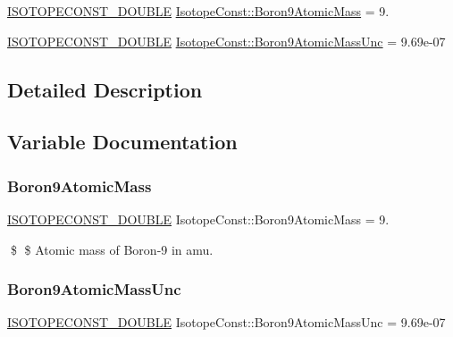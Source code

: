 \begin{DoxyCompactItemize}
\item 
\mbox{\hyperlink{group___isotope_const-_macros_ga8f45a7272ce02c0b4c65c44636ed719a}{I\+S\+O\+T\+O\+P\+E\+C\+O\+N\+S\+T\+\_\+\+D\+O\+U\+B\+LE}} \mbox{\hyperlink{group___isotope_const-_boron-_b9_ga5337f15dc8c7c59835e59dbca67ce544}{Isotope\+Const\+::\+Boron9\+Atomic\+Mass}} = 9.
\item 
\mbox{\hyperlink{group___isotope_const-_macros_ga8f45a7272ce02c0b4c65c44636ed719a}{I\+S\+O\+T\+O\+P\+E\+C\+O\+N\+S\+T\+\_\+\+D\+O\+U\+B\+LE}} \mbox{\hyperlink{group___isotope_const-_boron-_b9_ga8cd37457b5906b9b0eeb60c987074c89}{Isotope\+Const\+::\+Boron9\+Atomic\+Mass\+Unc}} = 9.\+69e-\/07
\end{DoxyCompactItemize}


\subsection{Detailed Description}


\subsection{Variable Documentation}
\mbox{\label{group___isotope_const-_boron-_b9_ga5337f15dc8c7c59835e59dbca67ce544}} 
\subsubsection{\texorpdfstring{Boron9\+Atomic\+Mass}{Boron9AtomicMass}}
{\footnotesize\ttfamily \mbox{\hyperlink{group___isotope_const-_macros_ga8f45a7272ce02c0b4c65c44636ed719a}{I\+S\+O\+T\+O\+P\+E\+C\+O\+N\+S\+T\+\_\+\+D\+O\+U\+B\+LE}} Isotope\+Const\+::\+Boron9\+Atomic\+Mass = 9.}

\$ \$ Atomic mass of Boron-\/9 in amu. \mbox{\label{group___isotope_const-_boron-_b9_ga8cd37457b5906b9b0eeb60c987074c89}} 
\subsubsection{\texorpdfstring{Boron9\+Atomic\+Mass\+Unc}{Boron9AtomicMassUnc}}
{\footnotesize\ttfamily \mbox{\hyperlink{group___isotope_const-_macros_ga8f45a7272ce02c0b4c65c44636ed719a}{I\+S\+O\+T\+O\+P\+E\+C\+O\+N\+S\+T\+\_\+\+D\+O\+U\+B\+LE}} Isotope\+Const\+::\+Boron9\+Atomic\+Mass\+Unc = 9.\+69e-\/07}

